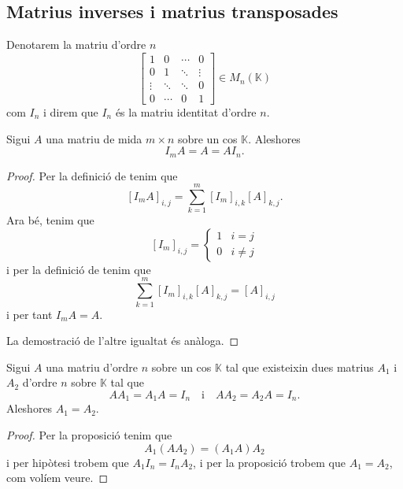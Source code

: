 \documentclass[../Apunts.tex]{subfiles}
\begin{document}
	\subsection{Matrius inverses i matrius transposades}
	\begin{notation}
		\label{notation:matriu identitat}
		Denotarem la matriu d'ordre \(n\)
		\[\left[\begin{matrix}
		1 & 0 & \cdots & 0 \\
		0 & 1 & \ddots & \vdots \\
		\vdots & \ddots & \ddots & 0\\
		0 & \cdots & 0 & 1
		\end{matrix}\right]
		\in M_{n}(\mathbb{K})\]
		com \(I_{n}\) i direm que \(I_{n}\) és la matriu identitat d'ordre \(n\).
	\end{notation}
	\begin{proposition}
		\label{prop:producte per la matriu identitat}
		Sigui \(A\) una matriu de mida \(m\times n\) sobre un cos \(\mathbb{K}\). Aleshores
		\[I_{m}A=A=AI_{n}.\]
		\begin{proof}
			Per la definició de  tenim que
			\[[I_{m}A]_{i,j}=\sum_{k=1}^{m}[I_{m}]_{i,k}[A]_{k,j}.\]
			Ara bé, tenim que
			\[[I_{m}]_{i,j}=
			\begin{cases}
			1 & i=j\\
			0 & i\neq j
			\end{cases}\]
			i per la definició de  tenim que
			\[\sum_{k=1}^{m}[I_{m}]_{i,k}[A]_{k,j}=[A]_{i,j}\]
			i per tant \(I_{m}A=A\).
			
			La demostració de l'altre igualtat és anàloga.
		\end{proof}
	\end{proposition}
	\begin{proposition}
		\label{prop:unicitat inverses de matrius pel producte}
		Sigui \(A\) una matriu d'ordre \(n\) sobre un cos \(\mathbb{K}\) tal que existeixin dues matrius \(A_{1}\) i \(A_{2}\) d'ordre \(n\) sobre \(\mathbb{K}\) tal que
		\[AA_{1}=A_{1}A=I_{n}\quad\text{i}\quad AA_{2}=A_{2}A=I_{n}.\]
		Aleshores \(A_{1}=A_{2}\).
		\begin{proof}
			Per la proposició  tenim que
			\[A_{1}(AA_{2})=(A_{1}A)A_{2}\]
			i per hipòtesi trobem que \(A_{1}I_{n}=I_{n}A_{2}\), i per la proposició  trobem que \(A_{1}=A_{2}\), com volíem veure.
		\end{proof}
	\end{proposition}
\end{document}

